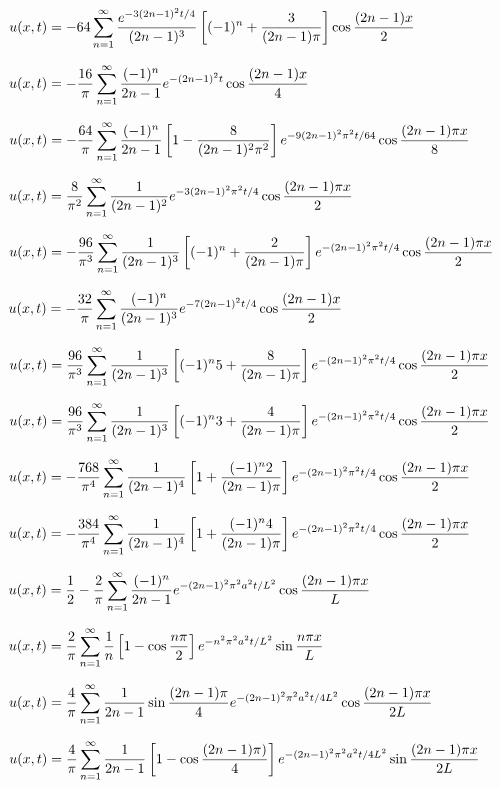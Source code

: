 $u(x,t)=-\displaystyle64\sum_{n=1}^\infty\frac{e^{-3(2n-1)^2t/4}}{(2n-1)^3}\left[
(-1)^n+\frac{3}{(2n-1)\pi}\right]\cos\frac{(2n-1)
x}{2}$


$u(x,t)=-\displaystyle\frac{16}{\pi} \sum^\infty_{n=1}
\frac{(-1)^n}{2n-1} e^{-(2n-1)^2t}\cos\frac{(2n-1)x}{4}$

$u(x,t)=\displaystyle-\frac{64}{\pi}\sum_{n=1}^\infty\frac{(-1)^n}{2n-1}\left[
1-\frac{8}{(2n-1)^2\pi^2}\right]e^{-9(2n-1)^2\pi^2 t/64}\cos\frac{(2n-1)\pi
x}{8}$

$u(x,t)=
\displaystyle\frac{8}{\pi^2}\sum_{n=1}^\infty\frac{1}{(2n-1)^2}
e^{-3(2n-1)^2\pi^2t/4}
\cos\frac{(2n-1)\pi x}{2}$


$u(x,t)=-\displaystyle\frac{96}{\pi^3}\sum_{n=1}^\infty\frac{1}{(2n-1)^3}\left[
(-1)^n+\frac{2}{(2n-1)\pi}\right]e^{-(2n-1)^2\pi^2t/4}\cos\frac{(2n-1)\pi
x}{2}$

$u(x,t)=-\displaystyle
\frac{32}{\pi}\sum_{n=1}^\infty\frac{(-1)^n}{
(2n-1)^3}e^{-7(2n-1)^2t/4}\cos\frac{(2n-1) x}{2}$

$u(x,t)=\displaystyle\frac{96}{\pi^3}\sum_{n=1}^\infty\frac{1}{(2n-1)^3}\left[
(-1)^n5+\frac{8}{(2n-1)\pi}\right]e^{-(2n-1)^2\pi^2t/4}\cos\frac{(2n-1)\pi
x}{2}$

$u(x,t)=\displaystyle\frac{96}{\pi^3}\sum_{n=1}^\infty\frac{1}{(2n-1)^3}\left[
(-1)^n3+\frac{4}{(2n-1)\pi}\right]e^{-(2n-1)^2\pi^2t/4}\cos\frac{(2n-1)\pi
x}{2}$

$u(x,t)=-\displaystyle\frac{768}{\pi^4}\sum_{n=1}^\infty\frac{1}{(2n-1)^4}\left[
1+\frac{(-1)^n2}{(2n-1)\pi}\right]e^{-(2n-1)^2\pi^2t/4}\cos\frac{(2n-1)\pi
x}{2}$

$u(x,t)=-\displaystyle\frac{384}{\pi^4}\sum_{n=1}^\infty\frac{1}{(2n-1)^4}\left[
1+\frac{(-1)^n4}{(2n-1)\pi}\right]e^{-(2n-1)^2\pi^2t/4}\cos\frac{(2n-1)\pi
x}{2}$


$u(x,t)=\displaystyle\frac{1}{2}-\frac{2}{\pi}\sum_{n=1}^\infty
\frac{(-1)^n}{2n-1}e^{-(2n-1)^2\pi^2a^2t/L^2}\cos\frac{(2n-1)\pi x}{L}$

$u(x,t)=\displaystyle\frac{2}{\pi}\sum_{n=1}^\infty\frac{1}{n}
\left[1-\cos\frac{n\pi}{2}\right]e^{-n^2\pi^2a^2t/L^2}\sin\frac{n\pi x}{L}$


$u(x,t)=\displaystyle\frac{4}{\pi}\sum_{n=1}^\infty\frac{1}{2n-1}\sin\frac{(2n-1)\pi}{4}
e^{-(2n-1)^2\pi^2a^2t/4L^2}\cos\frac{(2n-1)\pi x}{2L}$

$u(x,t)=\displaystyle\frac{4}{\pi}\sum_{n=1}^\infty\frac{1}{2n-1}
\left[1-\cos\frac{(2n-1)\pi)}{4}\right]
e^{-(2n-1)^2\pi^2a^2t/4L^2}\sin\frac{(2n-1)\pi x}{2L}$

